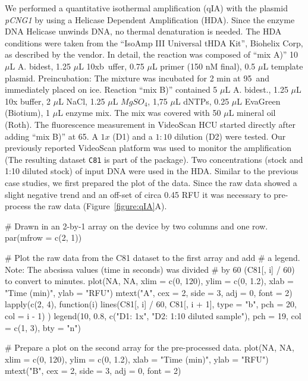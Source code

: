 We performed a quantitative isothermal amplification (qIA) with the plasmid 
\textit{pCNG1} by using a Helicase Dependent Amplification (HDA). Since the enzyme DNA 
Helicase unwinds DNA, no thermal denaturation is needed. The HDA 
conditions were taken from the ``IsoAmp III Universal tHDA Kit'', Biohelix Corp, 
as described by the vendor. In detail, the reaction was composed of ``mix A)'' 
10 $\mu$L A. bidest, 1.25 $\mu$L 10xb~uffer, 0.75 $\mu$L primer (150 nM final), 
0.5 $\mu$L template plasmid. Preincubation: The mixture was incubated for 2 min 
at 95\textcelsius~and immediately placed on ice. Reaction ``mix B)'' contained 5 
$\mu$L A. bidest., 1.25 $\mu$L 10x buffer, 2 $\mu$L NaCl, 1.25 $\mu$L 
$MgSO_{4}$, 1,75 $\mu$L dNTPs, 0.25 $\mu$L EvaGreen (Biotium), 1 $\mu$L enzyme 
mix. The mix was covered with 50 $\mu$L mineral oil (Roth). The fluorescence 
measurement in VideoScan HCU started directly after adding ``mix B)'' at 
65\textcelsius. A $1x$ (D1) and a $1:10$ dilution (D2) were tested. Our 
previously reported VideoScan platform \citep{rodiger_highly_2013} was used to 
monitor the amplification (The resulting dataset \texttt{C81} is part of the 
 package). Two concentrations (stock and 1:10 diluted stock) of 
input DNA were used in the HDA. Similar to the previous case studies, we first 
prepared the plot of the data. Since the raw 
data showed a slight negative trend and an off-set of circa 0.45 RFU 
it was necessary to pre-process the raw data (Figure~\ref{figure:qIA}A).

\begin{example}
# Drawn in an 2-by-1 array on the device by two columns and one row.
par(mfrow = c(2, 1))

# Plot the raw data from the C81 dataset to the first array and add
# a legend. Note: The abcsissa values (time in seconds) was divided 
# by 60 (C81[, i] / 60) to convert to minutes.
plot(NA, NA, xlim = c(0, 120), ylim = c(0, 1.2), xlab = "Time (min)", ylab = "RFU")
mtext("A", cex = 2, side = 3, adj = 0, font = 2)
lapply(c(2, 4), function(i) {
  lines(C81[, i] / 60, C81[, i + 1], type = "b", pch = 20, col = i - 1)
})
legend(10, 0.8, c("D1: 1x", "D2: 1:10 diluted sample"), pch = 19, col = c(1, 3), 
       bty = "n")

# Prepare a plot on the second array for the pre-processed data.
plot(NA, NA, xlim = c(0, 120), ylim = c(0, 1.2), xlab = "Time (min)", ylab = "RFU")
mtext("B", cex = 2, side = 3, adj = 0, font = 2)
\end{example}

